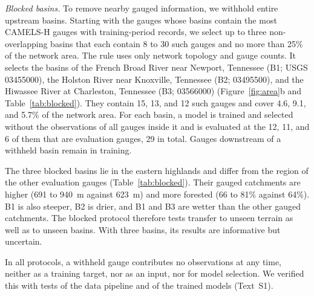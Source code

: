 \textit{Blocked basins.} To remove nearby gauged information, we withhold entire upstream basins. Starting with the gauges whose basins contain the most CAMELS-H gauges with training-period records, we select up to three non-overlapping basins that each contain 8 to 30 such gauges and no more than 25\% of the network area. The rule uses only network topology and gauge counts. It selects the basins of the French Broad River near Newport, Tennessee (B1; USGS 03455000), the Holston River near Knoxville, Tennessee (B2; 03495500), and the Hiwassee River at Charleston, Tennessee (B3; 03566000) (Figure~\ref{fig:area}b and Table~\ref{tab:blocked}). They contain 15, 13, and 12 such gauges and cover 4.6, 9.1, and 5.7\% of the network area. For each basin, a model is trained and selected without the observations of all gauges inside it and is evaluated at the 12, 11, and 6 of them that are evaluation gauges, 29 in total. Gauges downstream of a withheld basin remain in training.

The three blocked basins lie in the eastern highlands and differ from the region of the other evaluation gauges (Table~\ref{tab:blocked}). Their gauged catchments are higher (691 to 940~m against 623~m) and more forested (66 to 81\% against 64\%). B1 is also steeper, B2 is drier, and B1 and B3 are wetter than the other gauged catchments. The blocked protocol therefore tests transfer to unseen terrain as well as to unseen basins. With three basins, its results are informative but uncertain.

In all protocols, a withheld gauge contributes no observations at any time, neither as a training target, nor as an input, nor for model selection. We verified this with tests of the data pipeline and of the trained models (Text~S1).

